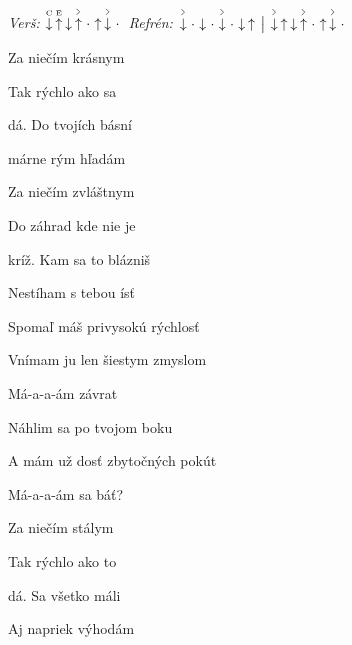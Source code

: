 \begin{song}


\begin{headerbox}
\RaiseBoxWithAccents
\textit{Verš:} $\PluckDown{C}\PluckUp{E}\Down\AccentUp\Miss\Up\AccentDown\Miss$ \quad
\textit{Refrén:} $\AccentDown\Miss\Down\Miss\AccentDown\Miss\Down\Up \Separator \AccentDown\Up\Down\AccentUp\Miss\Up\AccentDown\Miss$
\end{headerbox}

\begin{chordbox}
 \par
{} \par
{} \par
{} \par
\end{chordbox}

\Large

\bigskip


 Za niečím krásnym \par
{} Tak rýchlo ako sa \par
{}dá. Do tvojích básní \par
{}márne rým hľadám \par

\bigskip

 Za niečím zvláštnym \par
{} Do záhrad kde nie je \par
{}kríž. Kam sa to blázniš \par
Nestíham s tebou ísť \par

\bigskip

Spomaľ máš privysokú rýchlosť \par
{}Vnímam ju len šiestym zmyslom \par
{}Má-a-a-ám závrat  \par
{}Náhlim sa po tvojom boku \par
A mám už dosť zbytočných pokút \par
{}Má-a-a-ám sa báť?  \par

\bigskip

 Za niečím stálym \par
{} Tak rýchlo ako to \par
{}dá. Sa všetko máli \par
Aj napriek výhodám \par


\end{song}
